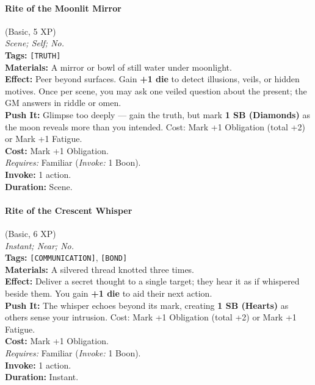\paragraph{Rite of the Moonlit Mirror} (Basic, 5 XP) \hfill \\
\emph{Scene; Self; No.} \\
\textbf{Tags:} \texttt{[TRUTH]} \\
\textbf{Materials:} A mirror or bowl of still water under moonlight. \\
\textbf{Effect:} Peer beyond surfaces. Gain \textbf{+1 die} to detect illusions, veils, or hidden motives. Once per scene, you may ask one veiled question about the present; the GM answers in riddle or omen. \\
\textbf{Push It:} Glimpse too deeply --- gain the truth, but mark \textbf{1 SB (Diamonds)} as the moon reveals more than you intended. Cost: Mark +1 Obligation (total +2) or Mark +1 Fatigue. \\
\textbf{Cost:} Mark +1 Obligation. \\
\textit{Requires:} Familiar (\textit{Invoke:} 1 Boon). \\
\textbf{Invoke:} 1 action. \\
\textbf{Duration:} Scene.

\paragraph{Rite of the Crescent Whisper} (Basic, 6 XP) \hfill \\
\emph{Instant; Near; No.} \\
\textbf{Tags:} \texttt{[COMMUNICATION]}, \texttt{[BOND]} \\
\textbf{Materials:} A silvered thread knotted three times. \\
\textbf{Effect:} Deliver a secret thought to a single target; they hear it as if whispered beside them. You gain \textbf{+1 die} to aid their next action. \\
\textbf{Push It:} The whisper echoes beyond its mark, creating \textbf{1 SB (Hearts)} as others sense your intrusion. Cost: Mark +1 Obligation (total +2) or Mark +1 Fatigue. \\
\textbf{Cost:} Mark +1 Obligation. \\
\textit{Requires:} Familiar (\textit{Invoke:} 1 Boon). \\
\textbf{Invoke:} 1 action. \\
\textbf{Duration:} Instant.

